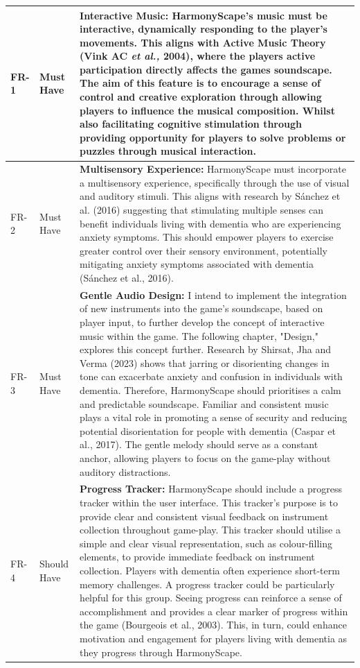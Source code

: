 \documentclass{l4proj}
\begin{document}
\begin{longtable}{|p{1.5cm}|p{1.5cm}|p{10cm}|}
FR-1 & Must Have & \textbf{Interactive Music:} HarmonyScape's music must be interactive, dynamically responding to the player's movements. This aligns with Active Music Theory (Vink AC \emph{et al.,} 2004), where the players active participation directly affects the games soundscape. The aim of this feature is to encourage a sense of control and creative exploration through allowing players to influence the musical composition. Whilst also facilitating cognitive stimulation through providing opportunity for players to solve problems or puzzles through musical interaction. \\ 
\hline
FR-2 & Must Have & \textbf{Multisensory Experience:} HarmonyScape must incorporate a multisensory experience, specifically through the use of visual and auditory stimuli. This aligns with research by Sánchez et al. (2016) suggesting that stimulating multiple senses can benefit individuals living with dementia who are experiencing anxiety symptoms. This should empower players to exercise greater control over their sensory environment, potentially mitigating anxiety symptoms associated with dementia (Sánchez et al., 2016). \\
\hline 
FR-3 & Must Have & \textbf{Gentle Audio Design:} I intend to implement the integration of new instruments into the game's soundscape, based on player input, to further develop the concept of interactive music within the game. The following chapter, "Design," explores this concept further. Research by Shirsat, Jha and Verma (2023) shows that jarring or disorienting changes in tone can exacerbate anxiety and confusion in individuals with dementia. Therefore, HarmonyScape should prioritises a calm and predictable soundscape. Familiar and consistent music plays a vital role in promoting a sense of security and reducing potential disorientation for people with dementia (Caspar et al., 2017). The gentle melody should serve as a constant anchor, allowing players to focus on the game-play without auditory distractions.  \\ 
\hline
FR-4 & Should Have & \textbf{Progress Tracker:} HarmonyScape should include a progress tracker within the user interface. This tracker's purpose is to provide clear and consistent visual feedback on instrument collection throughout game-play. This tracker should utilise a simple and clear visual representation, such as colour-filling elements, to provide immediate feedback on instrument collection. Players with dementia often experience short-term memory challenges. A progress tracker could be particularly helpful for this group. Seeing progress can reinforce a sense of accomplishment and provides a clear marker of progress within the game (Bourgeois et al., 2003). This, in turn, could enhance motivation and engagement for players living with dementia as they progress through HarmonyScape. \\ 

\end{longtable}
\end{document}
